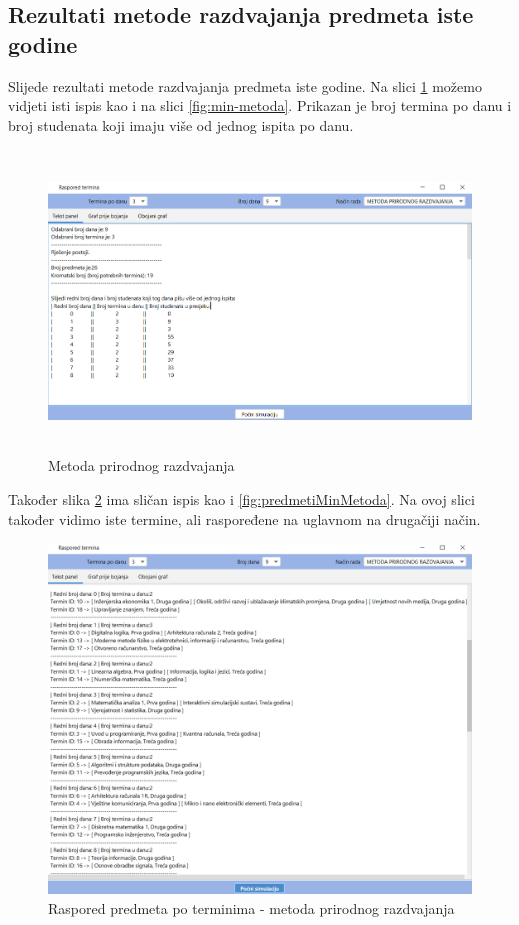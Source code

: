 \documentclass[times, utf8, zavrsni, numeric]{fer}
\begin{document}
\newpage
\subsection{Rezultati metode razdvajanja predmeta iste godine}
Slijede rezultati metode razdvajanja predmeta iste godine. Na slici \ref{fig:prirodnoRazdvajanjeRezultati} možemo vidjeti isti ispis kao i na slici \ref{fig:min-metoda}. Prikazan je broj termina po danu i broj studenata koji imaju više od jednog ispita po danu.

\begin{figure}[h!]
	\centering
	\includegraphics[width=13cm, height=8cm]{slike/prirodnoRazdvajanjeRezultati.png}
	\caption{Metoda prirodnog razdvajanja}
	\label{fig:prirodnoRazdvajanjeRezultati}
\end{figure}

Također slika \ref{fig:predmetiPrirodnoRazdvajanje} ima sličan ispis kao i \ref{fig:predmetiMinMetoda}. Na ovoj slici također vidimo iste termine, ali raspoređene na uglavnom na drugačiji način.
\begin{figure}[h!]
	\centering
	\includegraphics[width=0.9\columnwidth]{slike/predmetiPrirodnoRazdvajanje.png}
	\caption{Raspored predmeta po terminima - metoda prirodnog razdvajanja }
	\label{fig:predmetiPrirodnoRazdvajanje}
\end{figure}
\end{document}
